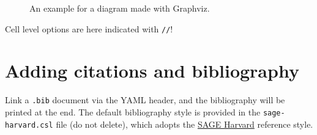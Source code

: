 \documentclass[
  letterpaper,
  DIV=11,
  numbers=noendperiod]{scrartcl}
\begin{document}
\begin{figure}


\caption{\label{fig-dot-diagram}An example for a diagram made with
Graphviz.}

\end{figure}%

\begin{tcolorbox}[enhanced jigsaw, toprule=.15mm, colbacktitle=quarto-callout-note-color!10!white, colback=white, rightrule=.15mm, left=2mm, title=\textcolor{quarto-callout-note-color}{\faInfo}\hspace{0.5em}{Note}, colframe=quarto-callout-note-color-frame, breakable, bottomtitle=1mm, opacitybacktitle=0.6, opacityback=0, bottomrule=.15mm, arc=.35mm, coltitle=black, leftrule=.75mm, toptitle=1mm, titlerule=0mm]

Cell level options are here indicated with \texttt{//\textbar{}}!

\end{tcolorbox}

\section{Adding citations and
bibliography}\label{adding-citations-and-bibliography}

Link a \texttt{.bib} document via the YAML header, and the bibliography
will be printed at the end. The default bibliography style is provided
in the \texttt{sage-harvard.csl} file (do not delete), which adopts the
\href{https://uk.sagepub.com/sites/default/files/sage_harvard_reference_style_0.pdf}{SAGE
Harvard} reference style.
\end{document}
